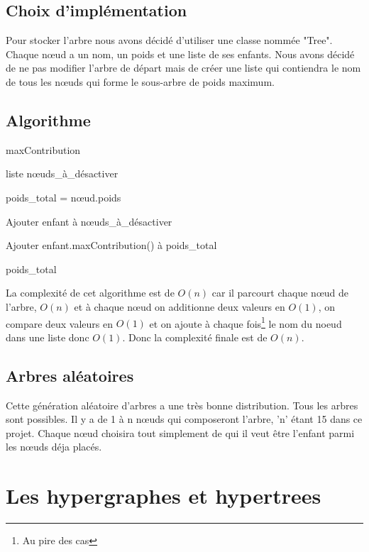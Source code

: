 \documentclass{article}
\begin{document}
	\subsection{Choix d'implémentation}

		Pour stocker l'arbre nous avons décidé d'utiliser une classe nommée "Tree". Chaque nœud a un nom, un poids et une liste de ses enfants. Nous avons décidé de ne pas modifier l'arbre de départ mais de créer une liste qui contiendra le nom de tous les nœuds qui forme le sous-arbre de poids maximum.
	
		\subsection{Algorithme}
		
		\begin{algorithm}[H]
		\caption{maxContribution}
		\begin{algorithmic}[1]
		\REQUIRE liste nœuds\_à\_désactiver

		\STATE poids\_total = nœud.poids
	
	
		\STATE Ajouter enfant à nœuds\_à\_désactiver

		\ELSE
		\STATE Ajouter enfant.maxContribution() à poids\_total
	
		\ENDIF	
		\ENDFOR

		\RETURN poids\_total

		\end{algorithmic}
		\end{algorithm}
	
		La complexité de cet algorithme est de $O(n)$ car il parcourt chaque nœud de l'arbre, $O(n)$ et à chaque nœud on additionne deux valeurs en $O(1)$, on compare deux valeurs en $O(1)$ et on ajoute à chaque fois\footnote{Au pire des cas} le nom du noeud dans une liste donc $O(1)$. Donc la complexité finale est de $O(n)$.
		
	\subsection{Arbres aléatoires}
	Cette génération aléatoire d'arbres a une très bonne distribution. Tous les arbres sont possibles. Il y a  de 1 à n nœuds qui composeront l'arbre, 'n' étant 15 dans ce projet. Chaque nœud choisira tout simplement de qui il veut être l'enfant parmi les nœuds déja placés.
	
\section{Les hypergraphes et hypertrees}
	
\end{document}
